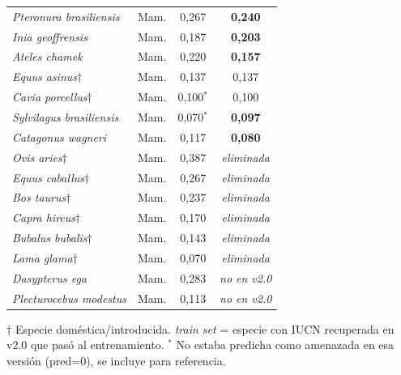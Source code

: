 \documentclass[12pt,a4paper]{article}
\begin{document}
\begin{longtable}{p{5cm}lcc}
  \textit{Pteronura brasiliensis}     & Mam. & 0,267 & \textbf{0,240} \\
  \textit{Inia geoffrensis}           & Mam. & 0,187 & \textbf{0,203} \\
  \textit{Ateles chamek}              & Mam. & 0,220 & \textbf{0,157} \\
  \rowcolor{rojoClaro}
  \textit{Equus asinus}$\dagger$      & Mam. & 0,137 & 0,137 \\
  \rowcolor{rojoClaro}
  \textit{Cavia porcellus}$\dagger$   & Mam. & 0,100$^*$ & 0,100 \\
  \textit{Sylvilagus brasiliensis}    & Mam. & 0,070$^*$ & \textbf{0,097} \\
  \textit{Catagonus wagneri}          & Mam. & 0,117 & \textbf{0,080} \\
  \midrule
  \rowcolor{verdeClaro}
  \textit{Ovis aries}$\dagger$        & Mam. & 0,387 & \textit{eliminada} \\
  \rowcolor{verdeClaro}
  \textit{Equus caballus}$\dagger$    & Mam. & 0,267 & \textit{eliminada} \\
  \rowcolor{verdeClaro}
  \textit{Bos taurus}$\dagger$        & Mam. & 0,237 & \textit{eliminada} \\
  \rowcolor{verdeClaro}
  \textit{Capra hircus}$\dagger$      & Mam. & 0,170 & \textit{eliminada} \\
  \rowcolor{verdeClaro}
  \textit{Bubalus bubalis}$\dagger$   & Mam. & 0,143 & \textit{eliminada} \\
  \rowcolor{verdeClaro}
  \textit{Lama glama}$\dagger$        & Mam. & 0,070 & \textit{eliminada} \\
  \rowcolor{verdeClaro}
  \textit{Dasypterus ega}             & Mam. & 0,283 & \textit{no en v2.0} \\
  \rowcolor{verdeClaro}
  \textit{Plecturocebus modestus}     & Mam. & 0,113 & \textit{no en v2.0} \\
\end{longtable}

\noindent\footnotesize{%
$\dagger$ Especie doméstica/introducida. \quad
\textit{train set} = especie con IUCN recuperada en v2.0 que pasó al entrenamiento. \quad
$^*$ No estaba predicha como amenazada en esa versión (pred=0), se incluye para referencia.}
\end{document}
